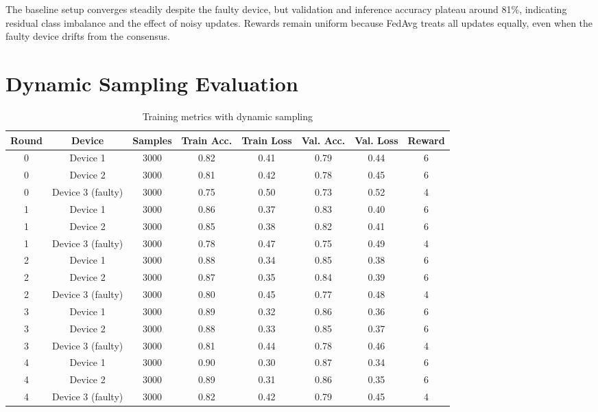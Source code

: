 The baseline setup converges steadily despite the faulty device, but validation and inference accuracy plateau around 81\%, indicating residual class imbalance and the effect of noisy updates. Rewards remain uniform because FedAvg treats all updates equally, even when the faulty device drifts from the consensus.

\section{Dynamic Sampling Evaluation}

\begin{table}[h!]
    \centering
    \caption{Training metrics with dynamic sampling}
    \label{tab:dynamic_sampling}
    \begin{tabular}{c c c c c c c c}
        \toprule
        \textbf{Round} & \textbf{Device} & \textbf{Samples} & \textbf{Train Acc.} & \textbf{Train Loss} & \textbf{Val. Acc.} & \textbf{Val. Loss} & \textbf{Reward} \\
        \midrule
        0 & Device 1 & 3000 & 0.82 & 0.41 & 0.79 & 0.44 & 6 \\
        0 & Device 2 & 3000 & 0.81 & 0.42 & 0.78 & 0.45 & 6 \\
        0 & Device 3 (faulty) & 3000 & 0.75 & 0.50 & 0.73 & 0.52 & 4 \\
        1 & Device 1 & 3000 & 0.86 & 0.37 & 0.83 & 0.40 & 6 \\
        1 & Device 2 & 3000 & 0.85 & 0.38 & 0.82 & 0.41 & 6 \\
        1 & Device 3 (faulty) & 3000 & 0.78 & 0.47 & 0.75 & 0.49 & 4 \\
        2 & Device 1 & 3000 & 0.88 & 0.34 & 0.85 & 0.38 & 6 \\
        2 & Device 2 & 3000 & 0.87 & 0.35 & 0.84 & 0.39 & 6 \\
        2 & Device 3 (faulty) & 3000 & 0.80 & 0.45 & 0.77 & 0.48 & 4 \\
        3 & Device 1 & 3000 & 0.89 & 0.32 & 0.86 & 0.36 & 6 \\
        3 & Device 2 & 3000 & 0.88 & 0.33 & 0.85 & 0.37 & 6 \\
        3 & Device 3 (faulty) & 3000 & 0.81 & 0.44 & 0.78 & 0.46 & 4 \\
        4 & Device 1 & 3000 & 0.90 & 0.30 & 0.87 & 0.34 & 6 \\
        4 & Device 2 & 3000 & 0.89 & 0.31 & 0.86 & 0.35 & 6 \\
        4 & Device 3 (faulty) & 3000 & 0.82 & 0.42 & 0.79 & 0.45 & 4 \\
        \bottomrule
    \end{tabular}
\end{table}

